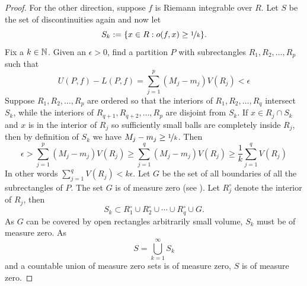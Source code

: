 \begin{proof}
For the other direction, suppose $f$ is Riemann integrable
over $R$.
Let $S$ be the set of discontinuities again and now let
\begin{equation*}
S_k := \{ x \in R : o(f,x) \geq \nicefrac{1}{k} \}.
\end{equation*}
Fix a $k \in {\mathbb{N}}$.
Given an $\epsilon > 0$, find a partition $P$ with subrectangles
$R_1,R_2,\ldots,R_p$ such that
\begin{equation*}
U(P,f)-L(P,f) =
\sum_{j=1}^p (M_j-m_j) V(R_j)
< \epsilon
\end{equation*}
Suppose $R_1,R_2,\ldots,R_p$ are ordered so that
the interiors of $R_1,R_2,\ldots,R_{q}$ intersect $S_k$,
while the interiors of $R_{q+1},R_{q+2},\ldots,R_p$
are disjoint from $S_k$.  If $x \in R_j \cap S_k$
and $x$ is in the interior of $R_j$ so
sufficiently small balls are completely inside $R_j$,
then by definition of $S_k$ we have
$M_j-m_j \geq \nicefrac{1}{k}$.
Then
\begin{equation*}
\epsilon >
\sum_{j=1}^p (M_j-m_j) V(R_j)
\geq
\sum_{j=1}^q (M_j-m_j) V(R_j)
\geq
\frac{1}{k}
\sum_{j=1}^q V(R_j)
\end{equation*}
In other words
$\sum_{j=1}^q V(R_j) < k \epsilon$.
Let $G$ be the set of all boundaries of all the subrectangles
of $P$.  The set $G$ is of measure zero (see ).
Let $R_j^\circ$ denote the interior of $R_j$, then
\begin{equation*}
S_k \subset R_1^\circ \cup R_2^\circ \cup \cdots \cup R_q^\circ \cup G .
\end{equation*}
As $G$ can be covered by open rectangles arbitrarily small volume,
$S_k$ must be of measure zero.  As
\begin{equation*}
S = \bigcup_{k=1}^\infty S_k
\end{equation*}
and a countable union of measure zero sets is of measure zero, 
$S$ is of measure zero.
\end{proof}

